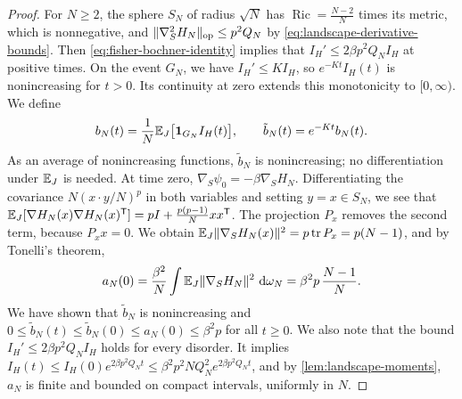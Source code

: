 \begin{proof}
For $N\ge2$, the sphere $S_N$ of radius $\sqrt N$ has $\operatorname{Ric}=\frac{N-2}{N}$ times its metric, which is nonnegative, and $\lVert\nabla_S^2H_N\rVert_{\mathrm{op}}\le p^2Q_N$ by \eqref{eq:landscape-derivative-bounds}. Then \eqref{eq:fisher-bochner-identity} implies that $I_H'\le2\beta p^2Q_NI_H$ at positive times. On the event $G_N$, we have $I_H'\le KI_H$, so $e^{-Kt}I_H(t)$ is nonincreasing for $t>0$. Its continuity at zero extends this monotonicity to $[0,\infty)$. We define
\[
 b_N(t)=\frac1N\mathbb E_J\bigl[\mathbf 1_{G_N}I_H(t)\bigr],
 \qquad
 \tilde b_N(t)=e^{-Kt}b_N(t).
\]
As an average of nonincreasing functions, $\tilde b_N$ is nonincreasing; no differentiation under $\mathbb E_J$ is needed. At time zero, $\nabla_S\psi_0=-\beta\nabla_SH_N$. Differentiating the covariance $N(x\cdot y/N)^p$ in both variables and setting $y=x\in S_N$, we see that $\mathbb E_J[\nabla H_N(x)\nabla H_N(x)^{\mathsf T}]=pI+\frac{p(p-1)}{N}xx^{\mathsf T}$. The projection $P_x$ removes the second term, because $P_xx=0$. We obtain $\mathbb E_J\lVert\nabla_SH_N(x)\rVert^2=p\operatorname{tr}P_x=p(N-1)$, and by Tonelli's theorem,
\[
 a_N(0)=\frac{\beta^2}{N}\int\mathbb E_J\lVert\nabla_SH_N\rVert^2\,\mathop{}\!\mathrm d\omega_N=\beta^2p\,\frac{N-1}{N}.
\]
We have shown that $\tilde b_N$ is nonincreasing and $0\le\tilde b_N(t)\le\tilde b_N(0)\le a_N(0)\le\beta^2p$ for all $t\ge0$. We also note that the bound $I_H'\le2\beta p^2Q_NI_H$ holds for every disorder. It implies $I_H(t)\le I_H(0)e^{2\beta p^2Q_Nt}\le\beta^2p^2NQ_N^2e^{2\beta p^2Q_Nt}$, and by \cref{lem:landscape-moments}, $a_N$ is finite and bounded on compact intervals, uniformly in $N$.


\end{proof}
